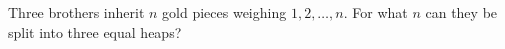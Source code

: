 Three brothers inherit $n$ gold pieces weighing $1, 2, \ldots, n$. For what $n$ can they be split into three equal heaps?
